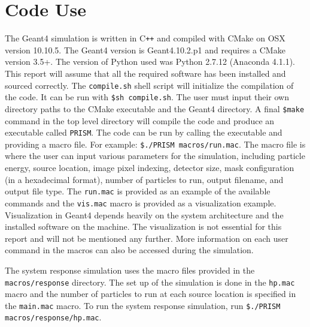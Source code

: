 \documentclass[10pt]{article}
\begin{document}
\section{Code Use}

The Geant4 simulation is written in C\verb!++! and compiled with CMake on OSX version 10.10.5. The Geant4 version is Geant4.10.2.p1 and requires a CMake version 3.5+. The version of Python used was Python 2.7.12  (Anaconda 4.1.1). This report will assume that all the required software has been installed and sourced correctly. The \verb!compile.sh! shell script will initialize the compilation of the code. It can be run with \verb!$sh compile.sh!. The user must input their own directory paths to the CMake executable and the Geant4 directory. A final \verb!$make! command in the top level directory will compile the code and produce an executable called \verb!PRISM!. The code can be run by calling the executable and providing a macro file. For example: \verb!$./PRISM macros/run.mac!. The macro file is where the user can input various parameters for the simulation, including particle energy, source location, image pixel indexing, detector size, mask configuration (in a hexadecimal format), number of particles to run, output filename, and output file type. The \verb!run.mac! is provided as an example of the available commands and the \verb!vis.mac! macro is provided as a visualization example. Visualization in Geant4 depends heavily on the system architecture and the installed software on the machine. The visualization is not essential for this report and will not be mentioned any further. More information on each user command in the macros can also be accessed during the simulation.

The system response simulation uses the macro files provided in the \verb!macros/response! directory. The set up of the simulation is done in the \verb!hp.mac! macro and the number of particles to run at each source location is specified in the \verb!main.mac! macro. To run the system response simulation, run \verb!$./PRISM macros/response/hp.mac!. 
\end{document}
